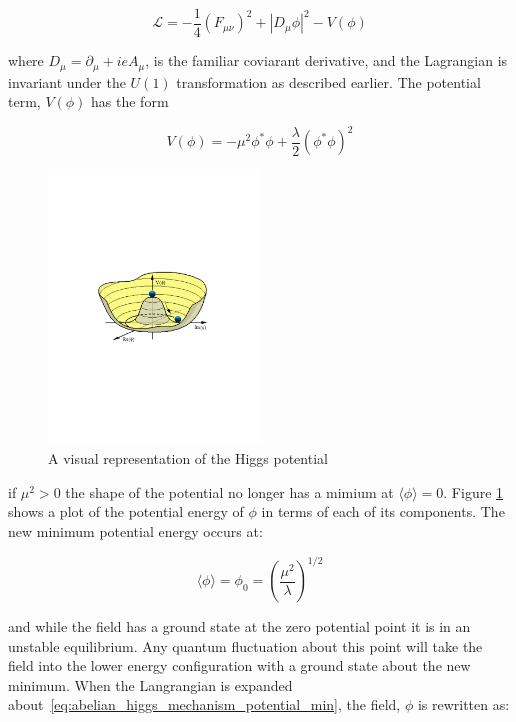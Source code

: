 \begin{equation}\label{eq:abelian_higgs_mechanism_lagrangian}
\mathcal{L} = -\frac{1}{4}(F_{\mu\nu})^{2} + |D_{\mu}\phi|^{2} -
V(\phi)
\end{equation}

\noindent where $D_{\mu} = \partial_{\mu} + ieA_{\mu}$, is the familiar
coviarant derivative, and the Lagrangian is invariant under the $U(1)$
transformation as described earlier.  The potential term, $V(\phi)$
has the form

\begin{equation}\label{eq:abelian_higgs_mechanism_potential}
V(\phi) = -\mu^{2}\phi^{\ast}\phi +
\frac{\lambda}{2}(\phi^{\ast}\phi)^{2}
\end{equation}

\begin{figure}[h]
   \centering
  \includegraphics[width=0.5\textwidth]{Figures/Basic_Diagrams/higgs-potential.pdf}
  \caption{A visual representation of the Higgs potential} \label{fig:higgs_potential}
\end{figure}

\noindent if $\mu^{2}>0$ the shape of the potential no longer has a
mimium at $\langle\phi\rangle = 0$.  Figure \ref{fig:higgs_potential}
shows a plot of the potential energy of $\phi$ in terms of each of its
components.  The new minimum potential energy
occurs at:

\begin{equation}\label{eq:abelian_higgs_mechanism_potential_min}
\langle\phi\rangle = \phi_{0} = \left(\frac{\mu^{2}}{\lambda}\right)^{1/2}
\end{equation}

\noindent and while the field has a ground state at the zero potential
point it is in an unstable equilibrium.  Any quantum fluctuation about
this point will take the field into the lower energy configuration
with a ground state about the new minimum.  When the Langrangian is
expanded about~\ref{eq:abelian_higgs_mechanism_potential_min}, the
field, $\phi$ is rewritten as: 


